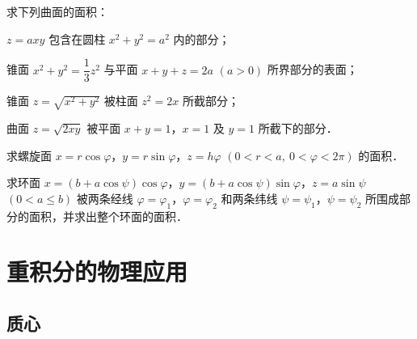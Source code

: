 \begin{xiti}
\item 求下列曲面的面积：
\begin{ziti}
\item $z=axy$ 包含在圆柱 $x^{2}+y^{2}=a^{2}$ 内的部分；
\item 锥面 $x^{2}+y^{2}=\dfrac{1}{3}z^{2}$ 与平面 $x+y+z=2a$ $(a>0)$ 所界部分的表面；
\item 锥面 $z=\sqrt{x^{2}+y^{2}}$ 被柱面 $z^{2}=2x$ 所截部分；
\item 曲面 $z=\sqrt{2xy}$ 被平面 $x+y=1$，$x=1$ 及 $y=1$ 所截下的部分．
\end{ziti}
\item 求螺旋面 $x=r\cos\varphi$，$y=r\sin\varphi$，$z=h\varphi$ $(0<r<a,\ 0<\varphi<2\pi)$ 的面积．
\item 求环面 $x=(b+a\cos\psi)\cos\varphi$，$y=(b+a\cos\psi)\sin\varphi$，$z=a\sin\psi$ $(0<a\leqslant b)$ 被两条经线 $\varphi=\varphi_{1}$，$\varphi=\varphi_{2}$ 和两条纬线 $\psi=\psi_{1}$，$\psi=\psi_{2}$ 所围成部分的面积，并求出整个环面的面积．
\end{xiti}

\section{重积分的物理应用}\label{sec:20-5}

\subsection{质心}

